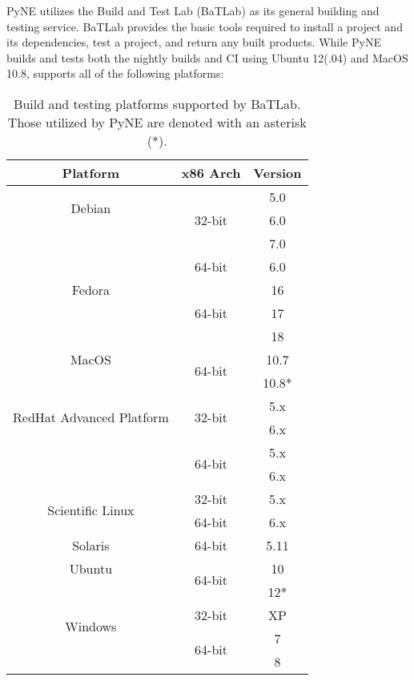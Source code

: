 \documentclass{anstrans}
\begin{document}
PyNE utilizes the Build and Test Lab (BaTLab) \cite{batlab_2014} as its general
building and testing service. BaTLab provides the basic tools required to
install a project and its dependencies, test a project, and return any built
products. While PyNE builds and tests both the nightly builds and CI using
Ubuntu 12(.04) and MacOS 10.8, supports all of the following platforms:

\begin{table}[ht]
  \begin{center}
    \caption{\label{tab::batlab}Build and testing platforms supported by BaTLab. 
      Those utilized by PyNE are denoted with an asterisk (*).}
    \begin{tabular}{|c|c|c|}
    \hline
    Platform & x86 Arch & Version \\
    \hline
    \multirow{2}{*}{Debian} 
    & \multirow{3}{*}{32-bit} & 5.0 \\ & & 6.0 \\ & & 7.0 \\ 
    \cline{2-3}
    & \multirow{1}{*}{64-bit} & 6.0 \\
    \hline
    \multirow{1}{*}{Fedora} 
    & \multirow{3}{*}{64-bit} & 16 \\ & & 17 \\ & & 18 \\
    \hline
    \multirow{1}{*}{MacOS} 
    & \multirow{2}{*}{64-bit} & 10.7 \\ & & 10.8* \\
    \hline
    \multirow{2}{*}{RedHat Advanced Platform} 
    & \multirow{2}{*}{32-bit} & 5.x \\ & & 6.x \\ 
    \cline{2-3}
    & \multirow{2}{*}{64-bit} & 5.x \\ & & 6.x \\
    \hline
    \multirow{2}{*}{Scientific Linux} 
    & \multirow{1}{*}{32-bit} & 5.x \\ 
    \cline{2-3}
    & \multirow{1}{*}{64-bit} & 6.x \\
    \hline
    \multirow{1}{*}{Solaris} 
    & \multirow{1}{*}{64-bit} & 5.11 \\
    \hline
    \multirow{1}{*}{Ubuntu} 
    & \multirow{2}{*}{64-bit} & 10 \\ & & 12* \\
    \hline
    \multirow{2}{*}{Windows} 
    & \multirow{1}{*}{32-bit} & XP \\ 
    \cline{2-3}
    & \multirow{2}{*}{64-bit} & 7 \\ & & 8 \\
    \hline
    \end{tabular}
  \end{center}
\end{table}
\end{document}
